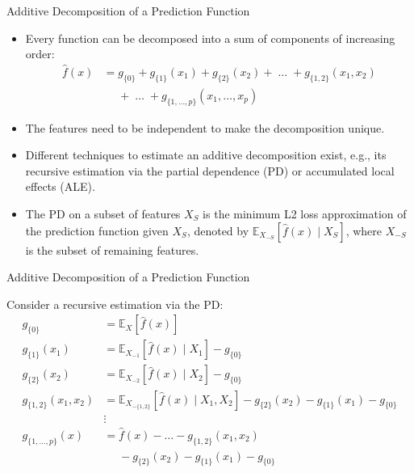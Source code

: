 \documentclass[11pt,compress,t,notes=noshow, xcolor=table]{beamer}
\begin{document}
\begin{vbframe}{Additive Decomposition of a Prediction Function}

\begin{itemize}
\item
Every function can be decomposed into a sum of components of increasing order:
\begin{align*}
\hat{f}(x) &= g_{\{0\}} + g_{\{1\}}(x_1) + g_{\{2\}}(x_2) + \;\dots\; + g_{\{1, 2\}}(x_1, x_2) \\
&\phantom{{}={}} + \;\dots\; + g_{\{1,\ldots,p\}}(x_1, \ldots,x_p)
\end{align*}
\item The features need to be independent to make the decomposition unique.
\item Different techniques to estimate an additive decomposition exist, e.g., its recursive estimation via the partial dependence (PD) or accumulated local effects (ALE).
\item The PD on a subset of features $X_S$ is the minimum L2 loss approximation of the prediction function given $X_S$, denoted by $\mathbb{E}_{X_{-S}}\left[\widehat{f}(x) \; \vert \; X_S \right]$, where $X_{-S}$ is the subset of remaining features.

\end{itemize}
\end{vbframe}

\begin{vbframe}{Additive Decomposition of a Prediction Function}

Consider a recursive estimation via the PD:
\begin{align*}
 g_{\{0\}} &= \mathbb{E}_X\left[\widehat{f}(x)\right] \\
 g_{\{1\}}(x_1) &= \mathbb{E}_{X_{-1}}\left[\widehat{f}(x) \; \vert  \; X_1 \right] - g_{\{0\}} \\
 g_{\{2\}}(x_2) &= \mathbb{E}_{X_{-2}}\left[\widehat{f}(x) \; \vert  \; X_2 \right] - g_{\{0\}} \\
 g_{\{1, 2\}}(x_1, x_2) &= \mathbb{E}_{X_{-\{1,2\}}}\left[\widehat{f}(x) \; \vert \; X_1, X_2 \right] - g_{\{2\}}(x_2) - g_{\{1\}}(x_1) - g_{\{0\}}\\
 &\vdots \\
 g_{\{1, \dots, p\}}(x) &= \widehat{f}(x) - \dots - g_{\{1, 2\}}(x_1, x_2) \\
 &\phantom{{}={}} - g_{\{2\}}(x_2) - g_{\{1\}}(x_1) - g_{\{0\}}\\
\end{align*}

\end{vbframe}
\end{document}
